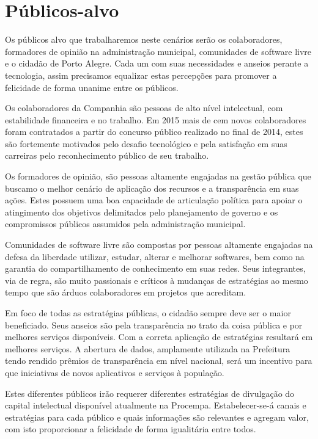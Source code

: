\section{Públicos-alvo}
Os públicos alvo que trabalharemos neste cenários serão os colaboradores, formadores de opinião na administração municipal, comunidades de software livre e o cidadão de Porto Alegre. Cada um com suas necessidades e anseios perante a tecnologia, assim precisamos equalizar estas percepções para promover a felicidade de forma unanime entre os públicos.

Os colaboradores da Companhia são pessoas de alto nível intelectual, com estabilidade financeira e no trabalho. Em 2015 mais de cem novos colaboradores foram contratados a partir do concurso público realizado no final de 2014, estes são fortemente motivados pelo desafio tecnológico e pela satisfação em suas carreiras pelo reconhecimento público de seu trabalho.

Os formadores de opinião, são pessoas altamente engajadas na gestão pública que buscamo o melhor cenário de aplicação dos recursos e a transparência em suas ações. Estes possuem uma boa capacidade de articulação política para apoiar o atingimento dos objetivos delimitados pelo planejamento de governo e os compromissos públicos assumidos pela administração municipal.

Comunidades de software livre são compostas por pessoas altamente engajadas na defesa da liberdade utilizar, estudar, alterar e melhorar softwares, bem como na garantia do compartilhamento de conhecimento em suas redes. Seus integrantes, via de regra, são muito passionais e críticos à mudanças de estratégias ao mesmo tempo que são árduos colaboradores em projetos que acreditam.

Em foco de todas as estratégias públicas, o cidadão sempre deve ser o maior beneficiado. Seus anseios são pela transparência no trato da coisa pública e por melhores serviços disponíveis. Com a correta aplicação de estratégias resultará em melhores serviços. A abertura de dados, amplamente utilizada na Prefeitura tendo rendido prêmios de transparência em nível nacional, será um incentivo para que iniciativas de novos aplicativos e serviços à população.

Estes diferentes públicos irão requerer diferentes estratégias de divulgação do capital intelectual disponível atualmente na Procempa. Estabelecer-se-á canais e estratégias para cada público e quais informações são relevantes e agregam valor, com isto proporcionar a felicidade de forma igualitária entre todos.
